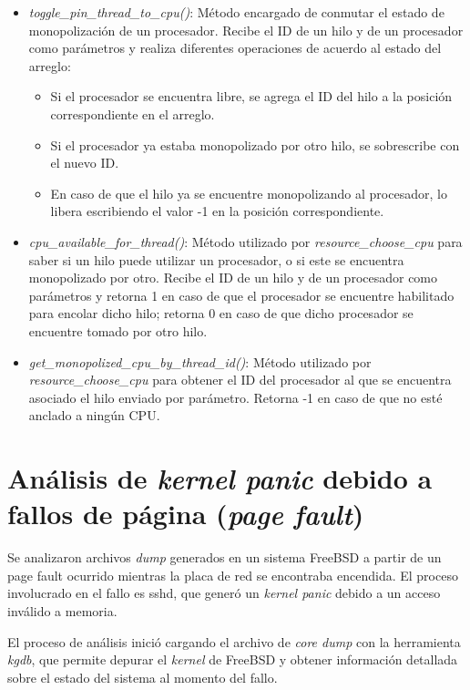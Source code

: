 \begin{itemize}
    \item \textit{toggle\_pin\_thread\_to\_cpu()}: Método encargado de conmutar el estado de monopolización de un procesador. Recibe el ID de un hilo y de un procesador como parámetros y realiza diferentes operaciones de acuerdo al estado del arreglo:
          \begin{itemize}
              \item Si el procesador se encuentra libre, se agrega el ID del hilo a la posición correspondiente en el arreglo.
              \item Si el procesador ya estaba monopolizado por otro hilo, se sobrescribe con el nuevo ID.
              \item En caso de que el hilo ya se encuentre monopolizando al procesador, lo libera escribiendo el valor -1 en la posición correspondiente.
          \end{itemize}
    \item \textit{cpu\_available\_for\_thread()}: Método utilizado por \textit{resource\_choose\_cpu} para saber si un hilo puede utilizar un procesador, o si este se encuentra monopolizado por otro. Recibe el ID de un hilo y de un procesador como parámetros y retorna 1 en caso de que el procesador se encuentre habilitado para encolar dicho hilo; retorna 0 en caso de que dicho procesador se encuentre tomado por otro hilo.
    \item \textit{get\_monopolized\_cpu\_by\_thread\_id()}: Método utilizado por \textit{resource\_choose\_cpu} para obtener el ID del procesador al que se encuentra asociado el hilo enviado por parámetro. Retorna -1 en caso de que no esté anclado a ningún CPU.\par
\end{itemize}

\chapter{Análisis de \textit{kernel panic} debido a fallos de página (\textit{page fault})}\label{appendix:apC}

Se analizaron archivos \textit{dump} generados en un sistema FreeBSD a partir de un page fault ocurrido mientras la placa de red se encontraba encendida. El proceso involucrado en el fallo es sshd, que generó un \textit{kernel panic} debido a un acceso inválido a memoria.

El proceso de análisis inició cargando el archivo de \textit{core dump} con la herramienta \textit{kgdb}, que permite depurar el \textit{kernel} de FreeBSD y obtener información detallada sobre el estado del sistema al momento del fallo.

